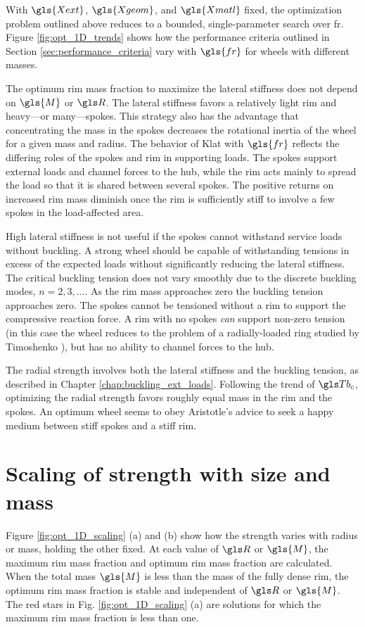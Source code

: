 \documentclass[\rootdir/thesis.tex]{subfiles}
\begin{document}
With $\gls{Xext}$, $\gls{Xgeom}$, and $\gls{Xmatl}$ fixed, the optimization problem outlined above reduces to a bounded, single-parameter search over \gls{fr}. Figure \ref{fig:opt_1D_trends} shows how the performance criteria outlined in Section \ref{sec:performance_criteria} vary with $\gls{fr}$ for wheels with different masses. 

The optimum rim mass fraction to maximize the lateral stiffness does not depend on $\gls{M}$ or $\R$. The lateral stiffness favors a relatively light rim and heavy---or many---spokes. This strategy also has the advantage that concentrating the mass in the spokes decreases the rotational inertia of the wheel for a given mass and radius. The behavior of \gls{Klat} with $\gls{fr}$ reflects the differing roles of the spokes and rim in supporting loads. The spokes support external loads and channel forces to the hub, while the rim acts mainly to spread the load so that it is shared between several spokes. The positive returns on increased rim mass diminish once the rim is sufficiently stiff to involve a few spokes in the load-affected area.

High lateral stiffness is not useful if the spokes cannot withstand service loads without buckling. A strong wheel should be capable of withstanding tensions in excess of the expected loads without significantly reducing the lateral stiffness. The critical buckling tension does not vary smoothly due to the discrete buckling modes, $n=2,3,...$. As the rim mass approaches zero the buckling tension approaches zero. The spokes cannot be tensioned without a rim to support the compressive reaction force. A rim with no spokes \emph{can} support non-zero tension (in this case the wheel reduces to the problem of a radially-loaded ring studied by Timoshenko \cite{Timoshenko1961}), but has no ability to channel forces to the hub.

The radial strength involves both the lateral stiffness and the buckling tension, as described in Chapter \ref{chap:buckling_ext_loads}. Following the trend of $\Tb_c$, optimizing the radial strength favors roughly equal mass in the rim and the spokes. An optimum wheel seems to obey Aristotle's advice to seek a happy medium between stiff spokes and a stiff rim.

\section{Scaling of strength with size and mass}

Figure \ref{fig:opt_1D_scaling} (a) and (b) show how the strength varies with radius or mass, holding the other fixed. At each value of $\R$ or $\gls{M}$, the maximum rim mass fraction and optimum rim mass fraction are calculated. When the total mass $\gls{M}$ is less than the mass of the fully dense rim, the optimum rim mass fraction is stable and independent of $\R$ or $\gls{M}$. The red stars in Fig. \ref{fig:opt_1D_scaling} (a) are solutions for which the maximum rim mass fraction is less than one.
\end{document}
